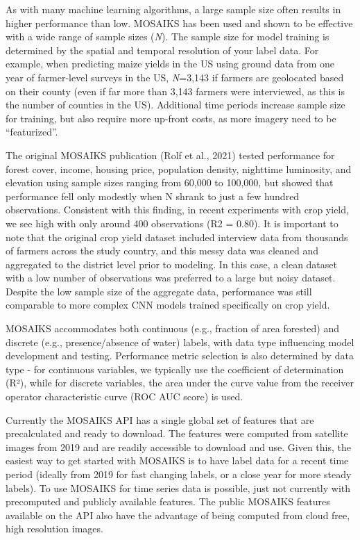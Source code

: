 \documentclass[
  letterpaper,
  DIV=11,
  numbers=noendperiod]{scrreprt}
\begin{document}
As with many machine learning algorithms, a large sample size often
results in higher performance than low. MOSAIKS has been used and shown
to be effective with a wide range of sample sizes (\emph{N}). The sample
size for model training is determined by the spatial and temporal
resolution of your label data. For example, when predicting maize yields
in the US using ground data from one year of farmer-level surveys in the
US, \emph{N}=3,143 if farmers are geolocated based on their county (even
if far more than 3,143 farmers were interviewed, as this is the number
of counties in the US). Additional time periods increase sample size for
training, but also require more up-front costs, as more imagery need to
be ``featurized''.

The original MOSAIKS publication (Rolf et al., 2021) tested performance
for forest cover, income, housing price, population density, nighttime
luminosity, and elevation using sample sizes ranging from 60,000 to
100,000, but showed that performance fell only modestly when N shrank to
just a few hundred observations. Consistent with this finding, in recent
experiments with crop yield, we see high with only around 400
observations (R2 = 0.80). It is important to note that the original crop
yield dataset included interview data from thousands of farmers across
the study country, and this messy data was cleaned and aggregated to the
district level prior to modeling. In this case, a clean dataset with a
low number of observations was preferred to a large but noisy dataset.
Despite the low sample size of the aggregate data, performance was still
comparable to more complex CNN models trained specifically on crop
yield.

MOSAIKS accommodates both continuous (e.g., fraction of area forested)
and discrete (e.g., presence/absence of water) labels, with data type
influencing model development and testing. Performance metric selection
is also determined by data type - for continuous variables, we typically
use the coefficient of determination (R²), while for discrete variables,
the area under the curve value from the receiver operator characteristic
curve (ROC AUC score) is used.

Currently the MOSAIKS API has a single global set of features that are
precalculated and ready to download. The features were computed from
satellite images from 2019 and are readily accessible to download and
use. Given this, the easiest way to get started with MOSAIKS is to have
label data for a recent time period (ideally from 2019 for fast changing
labels, or a close year for more steady labels). To use MOSAIKS for time
series data is possible, just not currently with precomputed and
publicly available features. The public MOSAIKS features available on
the API also have the advantage of being computed from cloud free, high
resolution images.
\end{document}
